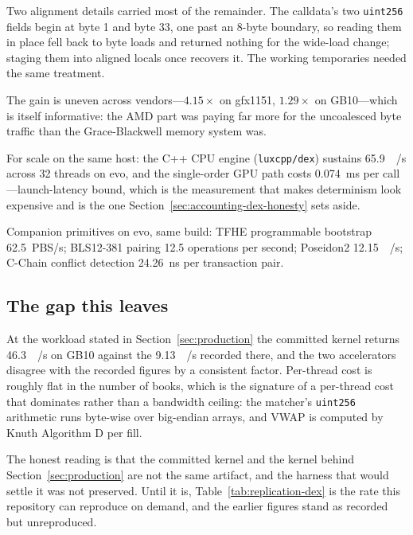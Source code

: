 Two alignment details carried most of the remainder. The calldata's two
\texttt{uint256} fields begin at byte 1 and byte 33, one past an 8-byte boundary,
so reading them in place fell back to byte loads and returned nothing for the
wide-load change; staging them into aligned locals once recovers it. The working
temporaries needed the same treatment.

The gain is uneven across vendors---$4.15\times$ on gfx1151, $1.29\times$ on
GB10---which is itself informative: the AMD part was paying far more for the
uncoalesced byte traffic than the Grace-Blackwell memory system was.

For scale on the same host: the C++ CPU engine (\texttt{luxcpp/dex}) sustains
\SI{65.9}{\mega{}/\second} across 32 threads on evo, and the
single-order GPU path costs \SI{0.074}{\milli\second} per call---launch-latency
bound, which is the measurement that makes determinism look expensive and is
the one Section~\ref{sec:accounting-dex-honesty} sets aside.

Companion primitives on evo, same build: TFHE programmable bootstrap
\SI{62.5}{PBS/\second}; BLS12-381 pairing \num{12.5} operations per second;
Poseidon2 \SI{12.15}{\mega{}/\second}; C-Chain conflict detection
\SI{24.26}{\nano\second} per transaction pair.

\subsection{The gap this leaves}

At the workload stated in Section~\ref{sec:production} the committed kernel
returns \SI{46.3}{\mega{}/\second} on GB10 against the
\SI{9.13}{\giga{}/\second} recorded there, and the two accelerators
disagree with the recorded figures by a consistent factor. Per-thread cost is
roughly flat in the number of books, which is the signature of a per-thread cost
that dominates rather than a bandwidth ceiling: the matcher's \verb|uint256|
arithmetic runs byte-wise over big-endian arrays, and VWAP is computed by Knuth
Algorithm D per fill.

The honest reading is that the committed kernel and the kernel behind
Section~\ref{sec:production} are not the same artifact, and the harness that
would settle it was not preserved. Until it is, Table~\ref{tab:replication-dex}
is the rate this repository can reproduce on demand, and the earlier figures
stand as recorded but unreproduced.
